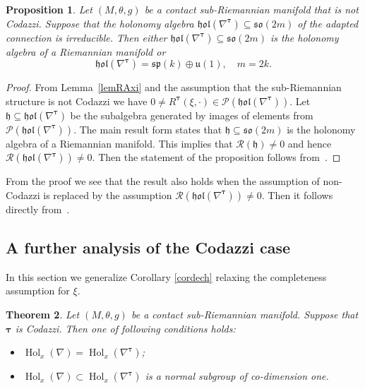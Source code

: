 \documentclass{amsart}
\theoremstyle{plain}
\newtheorem{theorem}{Theorem}[section]
\newtheorem{prop}[theorem]{Proposition}
\theoremstyle{definition}
\newcommand{\Hol}{\operatorname{Hol}}
\def\R{\mathcal{R}}
\def\P{\mathcal{P}}
\def\so{\mathfrak{so}}
\def\sp{\mathfrak{sp}}
\def\u{\mathfrak{u}}
\newcommand{\h}{\mathfrak{h}}
\newcommand{\hol}{\mathfrak{hol}}
\newcommand{\bt}{{\boldsymbol{\tau}}}
\newcommand{\1}{\mathbf{1}}
\newcommand{\+}{\oplus}
\begin{document}
\begin{prop}\label{propRieamHolor} Let $(M,\theta,g)$ be a contact sub-Riemannian manifold that is not Codazzi. Suppose that the holonomy algebra $\hol(\nabla^\bt)\subseteq\so(2m)$ of the adapted connection is irreducible. Then either 
$\hol(\nabla^\bt)\subseteq\so(2m)$ is the holonomy algebra of a Riemannian manifold or
$$\hol(\nabla^\bt)=\sp(k)\oplus\u(1),\quad m=2k.$$
\end{prop}

\begin{proof} 
From Lemma~\ref{lemRAxi} and the assumption that  the sub-Riemannian structure is not Codazzi  we have $0\not= R^\bt(\xi,\cdot)\in \P(\hol(\nabla^\bt))$. Let $\h\subseteq \hol(\nabla^\bt)$ be the subalgebra generated by images of elements from $\mathcal P(\hol(\nabla^\bt))$. The main result form \cite{Leistner} states that $\h\subseteq\so(2m)$ is the holonomy algebra of a Riemannian manifold. This implies that $\R(\h)\neq 0$ and hence $\R(\hol(\nabla^\bt))\neq 0$. Then the statement of the proposition follows from~\cite[Theorem~4.6]{C-S}. \end{proof}
From the proof we see that the result also holds when the assumption of non-Codazzi is replaced by the assumption $\R(\hol(\nabla^\bt))\not=0$. Then it follows directly from~\cite[Theorem~4.6]{C-S}.

\subsection{A further analysis of the Codazzi case}\label{secCodazziCase} In this section we generalize Corollary \ref{cordech} relaxing   the completeness assumption  for $\xi$.  


\begin{theorem}\label{thHolnabl}
	Let $(M,\theta,g)$ be a contact sub-Riemannian manifold. Suppose that $\bt$ is Codazzi.  Then one of following conditions holds:
	\begin{itemize}
		\item[1.] $\Hol_x(\nabla)=\Hol_x(\nabla^\bt)$;
		\item[2.]  $\Hol_x(\nabla)\subset\Hol_x(\nabla^\bt)$ is a normal subgroup of co-dimension one.
	\end{itemize} 
\end{theorem}
\end{document}
